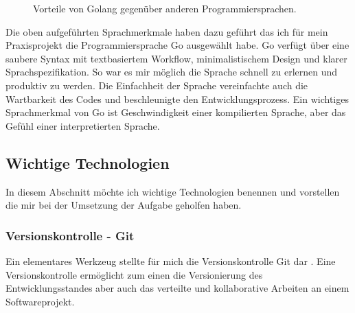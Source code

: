 \documentclass[12pt]{article}
\begin{document}
\begin{figure}[h!]
\centering
{}%
\hfill
{}%
\hfill
\caption{Vorteile von Golang gegenüber anderen Programmiersprachen.}
\end{figure}


Die oben aufgeführten Sprachmerkmale haben dazu geführt das ich für mein Praxisprojekt die Programmiersprache Go ausgewählt habe. Go verfügt über eine saubere Syntax mit textbasiertem Workflow, minimalistischem Design und klarer Sprachspezifikation. So war es mir möglich die Sprache schnell zu erlernen und produktiv zu werden. Die Einfachheit der Sprache vereinfachte auch die Wartbarkeit des Codes und beschleunigte den Entwicklungsprozess. Ein wichtiges Sprachmerkmal von Go ist Geschwindigkeit einer kompilierten Sprache, aber das Gefühl einer interpretierten Sprache.

\subsection{Wichtige Technologien}

In diesem Abschnitt möchte ich wichtige Technologien benennen und vorstellen die mir bei der Umsetzung der Aufgabe geholfen haben.

\subsubsection{Versionskontrolle - Git}

Ein elementares Werkzeug stellte für mich die Versionskontrolle Git dar \cite{GIT}. Eine Versionskontrolle ermöglicht zum einen die Versionierung des Entwicklungsstandes aber auch das verteilte und kollaborative Arbeiten an einem Softwareprojekt.
\end{document}
